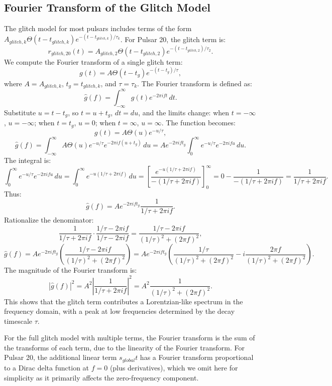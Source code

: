 \documentclass[11pt]{article}
\begin{document}
\subsection{Fourier Transform of the Glitch Model}
The glitch model for most pulsars includes terms of the form $A_{glitch,k} \Theta(t - t_{glitch,k}) e^{-(t - t_{glitch,k})/\tau_{k}}$. For Pulsar 20, the glitch term is:
\[
r_{glitch,20}(t) = A_{glitch,2} \Theta(t - t_{glitch,2}) e^{-(t - t_{glitch,2})/\tau_{2}}.
\]
We compute the Fourier transform of a single glitch term:
\[
g(t) = A \Theta(t - t_g) e^{-(t - t_g)/\tau},
\]
where $A = A_{glitch,k}$, $t_g = t_{glitch,k}$, and $\tau = \tau_k$. The Fourier transform is defined as:
\[
\hat{g}(f) = \int_{-\infty}^{\infty} g(t) e^{-2\pi i f t} \, dt.
\]
Substitute $u = t - t_g$, so $t = u + t_g$, $dt = du$, and the limits change: when $t = -\infty$, $u = -\infty$; when $t = t_g$, $u = 0$; when $t = \infty$, $u = \infty$. The function becomes:
\[
g(t) = A \Theta(u) e^{-u/\tau},
\]
\[
\hat{g}(f) = \int_{-\infty}^{\infty} A \Theta(u) e^{-u/\tau} e^{-2\pi i f (u + t_g)} \, du = A e^{-2\pi i f t_g} \int_0^{\infty} e^{-u/\tau} e^{-2\pi i f u} \, du.
\]
The integral is:
\[
\int_0^{\infty} e^{-u/\tau} e^{-2\pi i f u} \, du = \int_0^{\infty} e^{-u (1/\tau + 2\pi i f)} \, du = \left[ \frac{e^{-u (1/\tau + 2\pi i f)}}{- (1/\tau + 2\pi i f)} \right]_0^{\infty} = 0 - \frac{1}{- (1/\tau + 2\pi i f)} = \frac{1}{1/\tau + 2\pi i f}.
\]
Thus:
\[
\hat{g}(f) = A e^{-2\pi i f t_g} \frac{1}{1/\tau + 2\pi i f}.
\]
Rationalize the denominator:
\[
\frac{1}{1/\tau + 2\pi i f} \cdot \frac{1/\tau - 2\pi i f}{1/\tau - 2\pi i f} = \frac{1/\tau - 2\pi i f}{(1/\tau)^2 + (2\pi f)^2},
\]
\[
\hat{g}(f) = A e^{-2\pi i f t_g} \left( \frac{1/\tau - 2\pi i f}{(1/\tau)^2 + (2\pi f)^2} \right) = A e^{-2\pi i f t_g} \left( \frac{1/\tau}{(1/\tau)^2 + (2\pi f)^2} - i \frac{2\pi f}{(1/\tau)^2 + (2\pi f)^2} \right).
\]
The magnitude of the Fourier transform is:
\[
|\hat{g}(f)|^2 = A^2 \left| \frac{1}{1/\tau + 2\pi i f} \right|^2 = A^2 \frac{1}{(1/\tau)^2 + (2\pi f)^2}.
\]
This shows that the glitch term contributes a Lorentzian-like spectrum in the frequency domain, with a peak at low frequencies determined by the decay timescale $\tau$.

For the full glitch model with multiple terms, the Fourier transform is the sum of the transforms of each term, due to the linearity of the Fourier transform. For Pulsar 20, the additional linear term $s_{global} t$ has a Fourier transform proportional to a Dirac delta function at $f = 0$ (plus derivatives), which we omit here for simplicity as it primarily affects the zero-frequency component.
\end{document}
